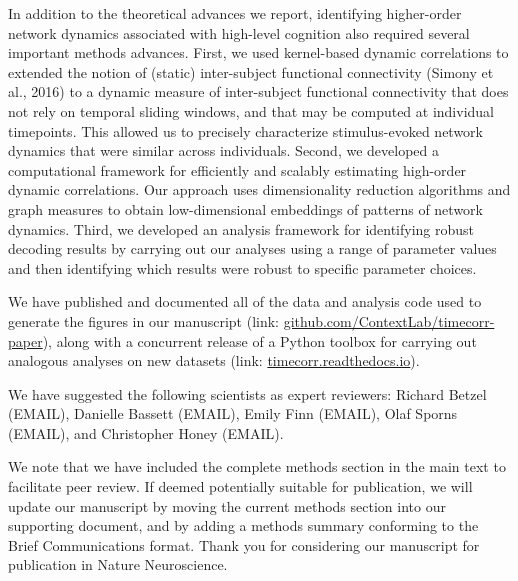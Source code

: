 \documentclass[11pt,stdletter,orderfromtodate,sigleft]{newlfm}
\begin{document}
\begin{newlfm}
  In addition to the theoretical advances we report, identifying
  higher-order network dynamics associated with high-level cognition
  also required several important methods advances.  First, we used
  kernel-based dynamic correlations to extended the notion of (static)
  inter-subject functional connectivity (Simony et al., 2016) to a
  dynamic measure of inter-subject functional connectivity that does
  not rely on temporal sliding windows, and that may be computed at
  individual timepoints.  This allowed us to precisely characterize
  stimulus-evoked network dynamics that were similar across
  individuals.  Second, we developed a computational framework for
  efficiently and scalably estimating high-order dynamic correlations.
  Our approach uses dimensionality reduction algorithms and graph
  measures to obtain low-dimensional embeddings of patterns of network
  dynamics.  Third, we developed an analysis framework for identifying
  robust decoding results by carrying out our analyses using a range
  of parameter values and then identifying which results were robust
  to specific parameter choices.

  We have published and documented all of the data and analysis code
  used to generate the figures in our manuscript (link:
  \href{https://github.com/ContextLab/timecorr-paper}{github.com/ContextLab/timecorr-paper}),
  along with a concurrent release of a Python toolbox for carrying out
  analogous analyses on new datasets (link:
  \href{http://timecorr.readthedocs.io}{timecorr.readthedocs.io}).

  We have suggested the following scientists as expert reviewers:
  Richard Betzel (EMAIL), Danielle Bassett (EMAIL), Emily Finn
  (EMAIL), Olaf Sporns (EMAIL), and Christopher Honey (EMAIL).

  We note that we have included the complete methods section in the
  main text to facilitate peer review.  If deemed potentially suitable
  for publication, we will update our manuscript by moving the current
  methods section into our supporting document, and by adding a
  methods summary conforming to the Brief Communications format.
  Thank you for considering our manuscript for publication in Nature
  Neuroscience.

\end{newlfm}
\end{document}
